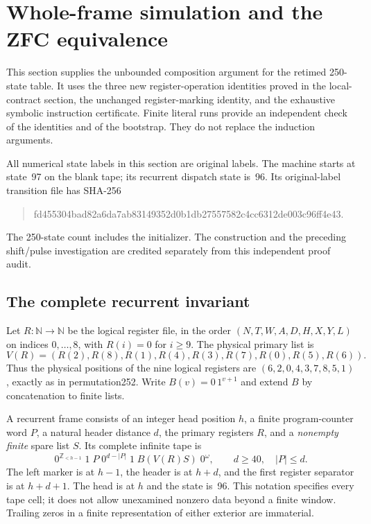 \section{Whole-frame simulation and the ZFC equivalence}
\label{sec:frame-calibration}

This section supplies the unbounded composition argument for the retimed
250-state table.  It uses the three new register-operation identities
proved in the local-contract section, the unchanged register-marking
identity, and the exhaustive symbolic instruction certificate.  Finite
literal runs provide an independent check of the identities and of the
bootstrap.  They do not replace the induction arguments.

All numerical state labels in this section are original labels.  The
machine starts at state~97 on the blank tape; its recurrent dispatch
state is~96.  Its original-label transition file has SHA-256
\begin{quote}\small\ttfamily
fd455304bad82a6da7ab83149352d0b1db27557582c4cc6312de003c96ff4e43.
\end{quote}
The 250-state count includes the initializer.  The construction and
the preceding shift/pulse investigation are credited separately from
this independent proof audit.

\subsection{The complete recurrent invariant}

Let $R:\mathbb N\to\mathbb N$ be the logical register file, in the order
$(N,T,W,A,D,H,X,Y,L)$ on indices $0,\ldots,8$, with
$R(i)=0$ for $i\ge9$.  The physical primary list is
\[
 V(R)=(R(2),R(8),R(1),R(4),R(3),R(7),R(0),R(5),R(6)).
\]
Thus the physical positions of the nine logical registers are
$(6,2,0,4,3,7,8,5,1)$, exactly as in permutation252.  Write
$B(v)=0\,1^{v+1}$ and extend $B$ by concatenation to finite lists.

A recurrent frame consists of an integer head position $h$, a finite
program-counter word $P$, a natural header distance $d$, the primary
registers $R$, and a \emph{nonempty finite} spare list $S$.  Its complete
infinite tape is
\[
 0^{\mathbb Z_{<h-1}}\;1\;P\;0^{d-|P|}\;1\;B(V(R)S)\;0^\omega,
 \qquad d\ge40,\quad |P|\le d.
\]
The left marker is at $h-1$, the header is at $h+d$, and the first
register separator is at $h+d+1$.  The head is at $h$ and the state
is~96.  This notation specifies every tape cell; it does not allow
unexamined nonzero data beyond a finite window.  Trailing zeros in a
finite representation of either exterior are immaterial.

